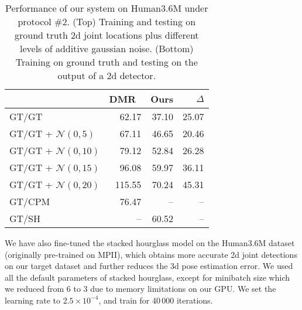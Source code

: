 \documentclass[10pt,twocolumn,letterpaper]{article}
\begin{document}
\begin{table}
\centering
\begin{tabular}{@{}lrrr@{}}
\toprule
 & DMR~\cite{distance-matrix} & Ours & $\Delta$\\
\midrule
GT/GT                       & 62.17 & 37.10 & 25.07\\
GT/GT + $\mathcal{N}(0,5)$  & 67.11  & 46.65 & 20.46\\
GT/GT + $\mathcal{N}(0,10)$ & 79.12 & 52.84 & 26.28\\
GT/GT + $\mathcal{N}(0,15)$ & 96.08 & 59.97 & 36.11\\
GT/GT + $\mathcal{N}(0,20)$ & 115.55 & 70.24 & 45.31\\
\midrule
GT/CPM~\cite{cpm} & 76.47 & -- & -- \\
GT/SH~\cite{stacked-hourglass}  & -- & 60.52 & --\\
\bottomrule
\end{tabular}
\vspace{3mm}
\caption{Performance of our system on Human3.6M under protocol \#2. (Top) Training and testing on ground truth 2d joint locations plus different levels of additive gaussian noise. (Bottom) Training on ground truth and testing on the output of a 2d detector.}
\label{tab:gt}
\end{table}

We have also fine-tuned the stacked hourglass model on the Human3.6M dataset (originally pre-trained on MPII),
which obtains more accurate 2d joint detections on our target dataset and further reduces the 3d pose estimation error. We used all the default parameters of stacked hourglass, except for minibatch size which we reduced from 6 to 3 due to memory limitations on our GPU. We set the learning rate to $2.5 \times 10^{-4}$, and train for 40\,000 iterations.
\end{document}
